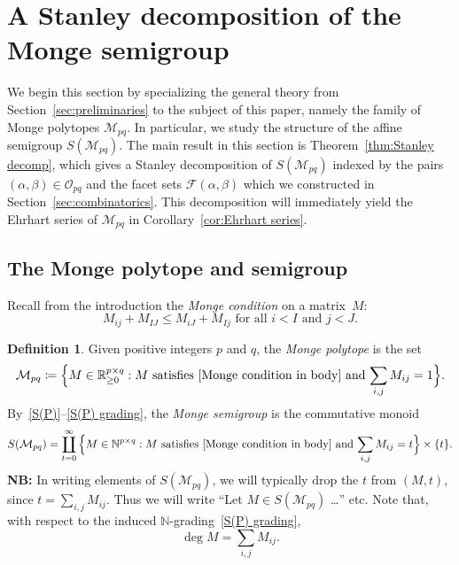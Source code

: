 \documentclass[noamsfonts,10pt]{amsart}
\newcommand{\N}{\mathbb{N}}
\newcommand{\R}{\mathbb{R}}
\newcommand{\M}{\mathcal{M}}
\newcommand{\al}{\alpha}
\newcommand{\be}{\beta}
\renewcommand{\O}{\mathcal{O}}
\newcommand{\F}{\mathcal{F}}
\newcommand{\1}{\mathbf{1}}
\theoremstyle{plain}
\theoremstyle{definition}
\newtheorem{dfn}[theorem]{Definition}
\numberwithin{equation}{section}
\begin{document}
\section{A Stanley decomposition of the Monge semigroup}
\label{sec:Stanley decomp}

We begin this section by specializing the general theory from Section~\ref{sec:preliminaries} to the subject of this paper, namely the family of Monge polytopes $\M_{pq}$.
In particular, we study the structure of the affine semigroup $S(\M_{pq})$.
The main result in this section is Theorem~\ref{thm:Stanley decomp}, which gives a Stanley decomposition of $S(\M_{pq})$ indexed by the pairs $(\al,\be) \in \O_{pq}$ and the facet sets $\F(\al,\be)$ which we constructed in Section~\ref{sec:combinatorics}.
This decomposition will immediately yield the Ehrhart series of $\M_{pq}$ in Corollary~\ref{cor:Ehrhart series}.


\subsection*{The Monge polytope and semigroup}

Recall from the introduction the \emph{Monge condition} on a matrix~$M$:
\begin{equation}
    \label{Monge condition in body}
    M_{ij} + M_{IJ} \leq M_{iJ} + M_{Ij} \text{ for all } i < I \text{ and } j < J.
\end{equation}

\begin{dfn}
    \label{def:Mpq}
    Given positive integers $p$ and $q$, the \emph{Monge polytope} is the set
    \[
        \M_{pq} \coloneqq \Big\{ M \in \R^{p \times q}_{\geq 0} : \text{$M$ satisfies~\eqref{Monge condition in body} and $\sum_{i,j} M_{ij} = 1$} \Big\}.
    \]
    By~\eqref{S(P)}--\eqref{S(P) grading}, the \emph{Monge semigroup} is the commutative monoid
    \[
        S(\M_{pq}) 
        = \coprod_{t=0}^\infty \Big\{ M \in \N^{p \times q} : \text{$M$ satisfies~\eqref{Monge condition in body} and $\sum_{i,j} M_{ij} = t$} \Big\} \times \{t\}.
    \]
    \textbf{NB:} In writing elements of $S(\M_{pq})$, we will typically drop the $t$ from $(M,t)$, since $t = \sum_{i,j} M_{ij}$.
    Thus we will write ``Let $M \in S(\M_{pq})$ \ldots'' etc.
    Note that, with respect to the induced $\N$-grading~\eqref{S(P) grading},
    \begin{equation}
        \label{deg M}
        \deg M = \sum_{i,j} M_{ij}.
    \end{equation}
\end{dfn}
\end{document}
